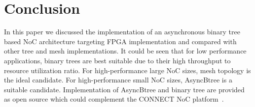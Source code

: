 \section{Conclusion}
\label{sec:conclusion}
In this paper we discussed the implementation of an asynchronous binary tree based NoC architecture targeting FPGA implementation and compared with other tree and mesh implementations.
It could be seen that for low performance applications, binary trees are best suitable due to their high throughput to resource utilization ratio.
For high-performance large NoC sizes, mesh topology is the ideal candidate.
For high-performance small NoC sizes, AsyncBtree is a suitable candidate.
Implementation of AsyncBtree and binary tree are provided as open source which could complement the CONNECT NoC platform~\cite{hnoc}.
